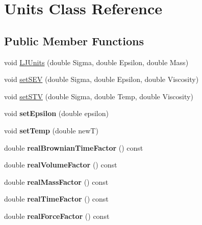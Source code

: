 \hypertarget{classUnits}{}\section{Units Class Reference}
\label{classUnits}
\subsection*{Public Member Functions}
\begin{DoxyCompactItemize}
\item 
void \hyperlink{classUnits_a8d13915639d6d6aa822bc3cff675edc2}{L\+J\+Units} (double Sigma, double Epsilon, double Mass)
\item 
void \hyperlink{classUnits_a1fad99fd9135dc231c3b1bbed280f3ba}{set\+S\+EV} (double Sigma, double Epsilon, double Viscosity)
\item 
void \hyperlink{classUnits_a58dd42e8873f092f4c4bcd4cafacf8d4}{set\+S\+TV} (double Sigma, double Temp, double Viscosity)
\item 
\mbox{\label{classUnits_adee8c2e4e9e98c41c89b752ff1d5068e}} 
void {\bfseries set\+Epsilon} (double epsilon)
\item 
\mbox{\label{classUnits_a828cad78ca1b652cb152d15d922577cf}} 
void {\bfseries set\+Temp} (double newT)
\item 
\mbox{\label{classUnits_a6e1682f824d25a9a5c148c2a020b3f9b}} 
double {\bfseries real\+Brownian\+Time\+Factor} () const
\item 
\mbox{\label{classUnits_aee20e272806faaa6e72cc3bcd30db12a}} 
double {\bfseries real\+Volume\+Factor} () const
\item 
\mbox{\label{classUnits_a49d8773afdca55740b7f85bb662bfded}} 
double {\bfseries real\+Mass\+Factor} () const
\item 
\mbox{\label{classUnits_aa647647bd9357a15ab00f0375d7f3a61}} 
double {\bfseries real\+Time\+Factor} () const
\item 
\mbox{\label{classUnits_a88036374523703ed508500400afa2c7e}} 
double {\bfseries real\+Force\+Factor} () const
\item 
\mbox{\label{classUnits_a0c6066064f71170ead01a2449a441678}} 

\end{DoxyCompactItemize}
